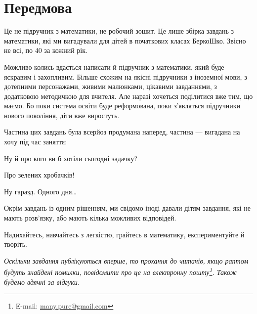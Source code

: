 \chapter*{Передмова}

Це не підручник з математики, не робочий зошит.
Це лише збірка завдань з математики, які ми вигадували для дітей
в початкових класах БеркоШко.
Звісно не всі, по 40 за кожний рік.

Можливо колись вдасться написати й підручник з математики,
який буде яскравим і захопливим.
Більше схожим на якісні підручники з іноземної мови, з дотепними персонажами,
живими малюнками, цікавими завданнями, з додатковою методичкою для вчителя.
Але наразі хочеться поділитися вже тим, що маємо.
Бо поки система освіти буде реформована, поки з’являться підручники
нового покоління, діти вже виростуть.

Частина цих завдань була всерйоз продумана наперед,
частина --- вигадана на хочу під час заняття:
\begin{dialogue}
    \item Ну й про кого ви б хотіли сьогодні задачку?
    \item Про зелених хробачків!
    \item Ну гаразд. Одного дня\ldots
\end{dialogue}

Окрім завдань із одним рішенням, ми свідомо іноді давали дітям завдання,
які не мають розв’язку, або мають кілька можливих відповідей.

Надихайтесь, навчайтесь з легкістю, грайтесь в математику,
експериментуйте й творіть. \smiley

\medskip
\medskip

\emph{\small
Оскільки завдання публікуються вперше, то прохання до читачів,
якщо раптом будуть знайдені помилки,
повідомити про це на електронну пошту\footnote{
    E-mail: \url{many.pure@gmail.com}
}. Також будемо вдячні за відгуки.
}%
\smiley
